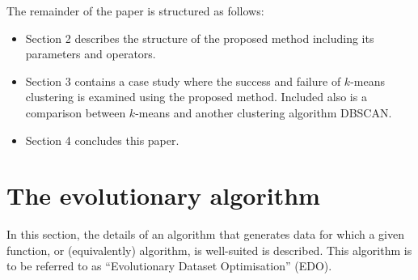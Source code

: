 \documentclass[smallextended]{svjour3}
\begin{document}
The remainder of the paper is structured as follows:
\begin{itemize}
    \item Section 2 describes the structure of the proposed method including its
        parameters and operators.
    \item Section 3 contains a case study where the success and failure of
        \(k\)-means clustering is examined using the proposed method. Included
        also is a comparison between \(k\)-means and another clustering
        algorithm DBSCAN.\
    \item Section 4 concludes this paper.
\end{itemize}

\section{The evolutionary algorithm}\label{section:algorithm}

In this section, the details of an algorithm that generates data for which a
given function, or (equivalently) algorithm, is well-suited is described. This
algorithm is to be referred to as ``Evolutionary Dataset Optimisation'' (EDO).
\end{document}
